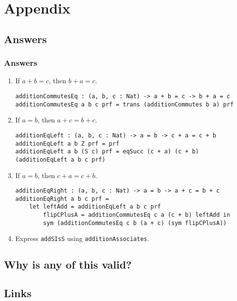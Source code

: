\documentclass{article}
\newcommand{\inline}[1]{\texttt{#1}}
\begin{document}
\section{Appendix}

\subsection{Answers}
\subsubsection{Answers}

\begin{enumerate}
    \item If $a + b = c$, then $b + a = c$.

\begin{verbatim}
additionCommutesEq : (a, b, c : Nat) -> a + b = c -> b + a = c
additionCommutesEq a b c prf = trans (additionCommutes b a) prf
\end{verbatim}

    \item If $a = b$, then $a + c = b + c$.

\begin{verbatim}
additionEqLeft : (a, b, c : Nat) -> a = b -> c + a = c + b
additionEqLeft a b Z prf = prf
additionEqLeft a b (S c) prf = eqSucc (c + a) (c + b) (additionEqLeft a b c prf)
\end{verbatim}

    \item If $a = b$, then $c + a = c + b$.

\begin{verbatim}
additionEqRight : (a, b, c : Nat) -> a = b -> a + c = b + c
additionEqRight a b c prf =
    let leftAdd = additionEqLeft a b c prf
        flipCPlusA = additionCommutesEq c a (c + b) leftAdd in
        sym (additionCommutesEq c b (a + c) (sym flipCPlusA))
\end{verbatim}

    \item Express \inline{addSIsS} using \inline{additionAssociates}.
\end{enumerate}

\subsection{Why is any of this valid?}

\subsection{Links}
\end{document}
